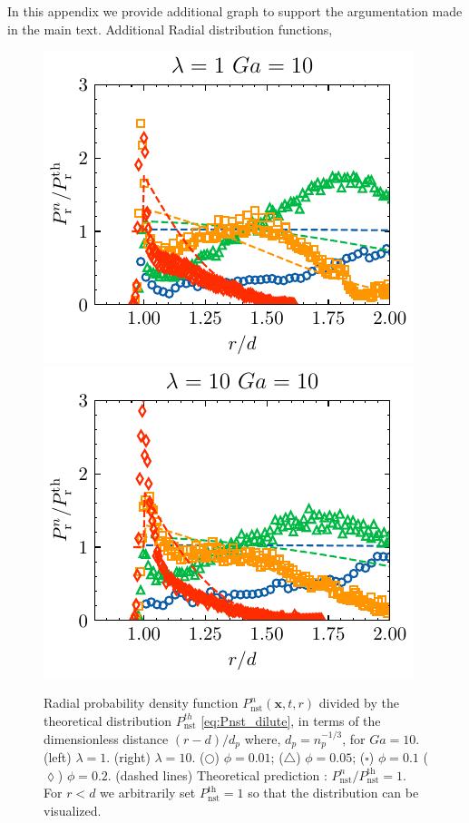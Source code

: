 In this appendix we provide additional graph to support the argumentation made in the main text. 
Additional Radial distribution functions, 
\begin{figure}[h!]
    \centering
    \includegraphics[height=0.3\textwidth]{image/HOMOGENEOUS_NEW/Dist/Pr_l_1_Ga_10.pdf}
    \includegraphics[height=0.3\textwidth]{image/HOMOGENEOUS_NEW/Dist/Pr_l_10_Ga_10.pdf}
    \caption{Radial probability density function $P_\text{nst}^n(\textbf{x},t,r)$ divided by the theoretical distribution $P_\text{nst}^{th}$ \ref{eq:Pnst_dilute}, in terms of the dimensionless distance $(r-d)/d_p$ where, $d_p = n_p^{-1/3}$, for  $Ga = 10$.
    (left)  $\lambda = 1$.
    (right) $\lambda = 10$.
    ($\pmb\bigcirc$) $\phi = 0.01$; ($\pmb\triangle$) $ \phi = 0.05$; ($\pmb\square$) $\phi = 0.1$ ($\pmb\lozenge$) $\phi = 0.2$.
    (dashed lines) Theoretical prediction : $P_\text{nst}^n/P_\text{nst}^\text{th} = 1$. 
    For $r<d$ we arbitrarily set $P_\text{nst}^\text{th} = 1$ so that the distribution can be visualized.
    }
    \label{fig:Pr_low}
\end{figure}

